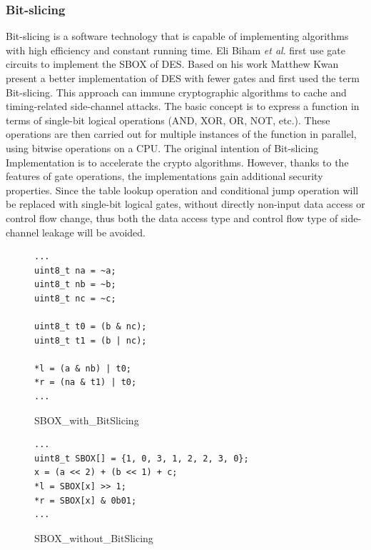 \subsubsection{Bit-slicing}
Bit-slicing is a software technology that is capable of implementing algorithms 
with high efficiency and constant running time. 
Eli Biham \textit{et al}. first use gate circuits to implement the SBOX of DES.
Based on his work Matthew Kwan present a better implementation of DES with fewer
gates and first used the term Bit-slicing.
This approach can immune cryptographic algorithms to cache and timing-related 
side-channel attacks. The basic concept is to express a function in terms of 
single-bit logical operations (AND, XOR, OR, NOT, etc.). These operations are 
then carried out for multiple instances of the function in parallel, using 
bitwise operations on a CPU. The original intention of Bit-slicing 
Implementation is to accelerate the crypto algorithms. However, thanks to the 
features of gate operations, the implementations gain additional security properties. 
Since the table lookup operation and conditional jump operation will be replaced 
with single-bit logical gates, without directly non-input data access or control 
flow change, thus both the data access type and control flow type of side-channel 
leakage will be avoided.

\begin{figure}[h!]
    \centering
\begin{lstlisting}[xleftmargin=.02\textwidth,xrightmargin=.01\textwidth]
...
uint8_t na = ~a;
uint8_t nb = ~b;
uint8_t nc = ~c;

uint8_t t0 = (b & nc);
uint8_t t1 = (b | nc);

*l = (a & nb) | t0;
*r = (na & t1) | t0;
...
\end{lstlisting}
\caption{SBOX\_with\_BitSlicing}
\label{SBOX_bitslicing}
\end{figure}

\begin{figure}[h!]
    \centering
\begin{lstlisting}[xleftmargin=.02\textwidth,xrightmargin=.01\textwidth]
...
uint8_t SBOX[] = {1, 0, 3, 1, 2, 2, 3, 0};
x = (a << 2) + (b << 1) + c;
*l = SBOX[x] >> 1;
*r = SBOX[x] & 0b01;
...
\end{lstlisting}
\caption{SBOX\_without\_BitSlicing}
\label{SBOX_da}
\end{figure}

